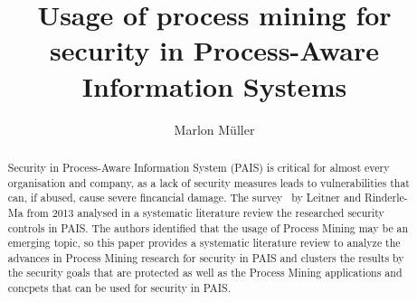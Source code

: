 \documentclass[runningheads]{llncs}
\begin{document}
%
\title{Usage of process mining for security in Process-Aware Information Systems}
%
%
\author{Marlon Müller}
%
%
%
\maketitle              %
%
\begin{abstract}
    Security in Process-Aware Information System (PAIS) is critical for almost every organisation and company, as a lack of security measures leads to vulnerabilities that can, if abused, cause severe fincancial damage.
    The survey~\cite{Leitner2014273} by Leitner and Rinderle-Ma from 2013 analysed in a systematic literature review the researched security controls in PAIS\@. The authors identified that the usage
    of Process Mining may be an emerging topic, so this paper provides a systematic literature review to analyze the advances in Process Mining research for security in PAIS and clusters the results
    by the security goals that are protected as well as the Process Mining applications and concpets that can be used for security in PAIS\@.

\end{abstract}
%
%
%
\end{document}
